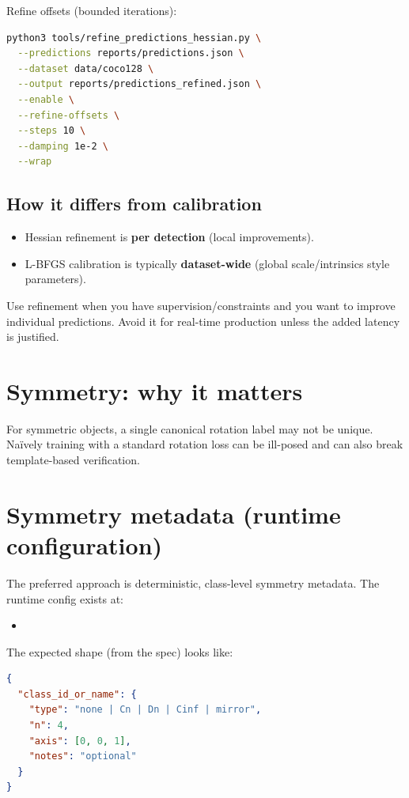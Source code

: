 Refine offsets (bounded iterations):
\begin{lstlisting}[language=bash]
python3 tools/refine_predictions_hessian.py \
  --predictions reports/predictions.json \
  --dataset data/coco128 \
  --output reports/predictions_refined.json \
  --enable \
  --refine-offsets \
  --steps 10 \
  --damping 1e-2 \
  --wrap
\end{lstlisting}

\subsection{How it differs from calibration}
\begin{itemize}
  \item Hessian refinement is \textbf{per detection} (local improvements).
  \item L-BFGS calibration is typically \textbf{dataset-wide} (global scale/intrinsics style parameters).
\end{itemize}

Use refinement when you have supervision/constraints and you want to improve individual predictions.
Avoid it for real-time production unless the added latency is justified.

\section{Symmetry: why it matters}
For symmetric objects, a single canonical rotation label may not be unique.
Na\"ively training with a standard rotation loss can be ill-posed and can also break template-based verification.

\section{Symmetry metadata (runtime configuration)}
The preferred approach is deterministic, class-level symmetry metadata.
The runtime config exists at:
\begin{itemize}
  \item {}
\end{itemize}

The expected shape (from the spec) looks like:
\begin{lstlisting}[language=json]
{
  "class_id_or_name": {
    "type": "none | Cn | Dn | Cinf | mirror",
    "n": 4,
    "axis": [0, 0, 1],
    "notes": "optional"
  }
}
\end{lstlisting}

